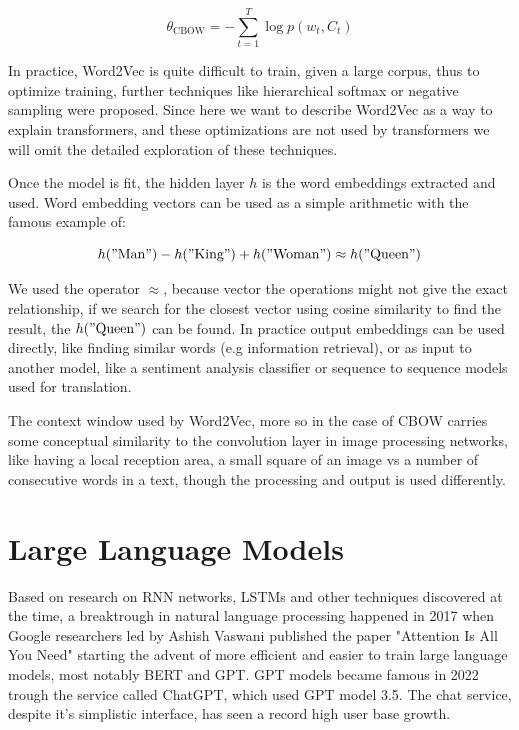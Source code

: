\[\theta_{\operatorname{CBOW}} = -\sum_{t=1}^{T} \log p(w_t,C_t)\]

In practice, Word2Vec is quite difficult to train, given a large corpus, thus to optimize training, further techniques like hierarchical softmax or negative sampling were proposed. Since here we want to describe Word2Vec as a way to explain transformers, and these optimizations are not used by transformers we will omit the detailed exploration of these techniques.

Once the model is fit, the hidden layer \(h\) is the word embeddings extracted and used. Word embedding vectors can be used as a simple arithmetic with the famous example of:

\[h(\operatorname{"Man"}) - h(\operatorname{"King"}) + h(\operatorname{"Woman"}) \approx h(\operatorname{"Queen"})\]

We used the operator \(\approx\), because vector the operations might not give the exact relationship, if we search for the closest vector using cosine similarity to find the result, the \(h(\operatorname{"Queen"})\) can be found. In practice output embeddings can be used directly, like finding similar words (e.g information retrieval), or as input to another model, like a sentiment analysis classifier or sequence to sequence models used for translation.

The context window used by Word2Vec, more so in the case of CBOW carries some conceptual similarity to the convolution layer in image processing networks, like having a local reception area, a small square of an image vs a number of consecutive words in a text, though the processing and output is used differently.

\section{Large Language Models}

Based on research on RNN networks, LSTMs and other techniques discovered at the time, a breaktrough in natural language processing happened in 2017 when Google researchers led by Ashish Vaswani published the paper "Attention Is All You Need" starting the advent of more efficient and easier to train large language models, most notably BERT and GPT. GPT models became famous in 2022 trough the service called ChatGPT, which used GPT model 3.5. The chat service, despite it's simplistic interface, has seen a record high user base growth.



